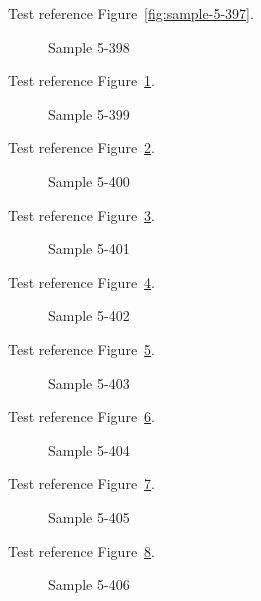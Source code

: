 Test reference Figure~\ref{fig:sample-5-397}.

\begin{figure}[tbhp]
\caption{Sample 5-398}
\label{fig:sample-5-398}
\end{figure}

Test reference Figure~\ref{fig:sample-5-398}.

\begin{figure}[tbhp]
\caption{Sample 5-399}
\label{fig:sample-5-399}
\end{figure}

Test reference Figure~\ref{fig:sample-5-399}.

\begin{figure}[tbhp]
\caption{Sample 5-400}
\label{fig:sample-5-400}
\end{figure}

Test reference Figure~\ref{fig:sample-5-400}.

\begin{figure}[tbhp]
\caption{Sample 5-401}
\label{fig:sample-5-401}
\end{figure}

Test reference Figure~\ref{fig:sample-5-401}.

\begin{figure}[tbhp]
\caption{Sample 5-402}
\label{fig:sample-5-402}
\end{figure}

Test reference Figure~\ref{fig:sample-5-402}.

\begin{figure}[tbhp]
\caption{Sample 5-403}
\label{fig:sample-5-403}
\end{figure}

Test reference Figure~\ref{fig:sample-5-403}.

\begin{figure}[tbhp]
\caption{Sample 5-404}
\label{fig:sample-5-404}
\end{figure}

Test reference Figure~\ref{fig:sample-5-404}.

\begin{figure}[tbhp]
\caption{Sample 5-405}
\label{fig:sample-5-405}
\end{figure}

Test reference Figure~\ref{fig:sample-5-405}.

\begin{figure}[tbhp]
\caption{Sample 5-406}
\label{fig:sample-5-406}
\end{figure}

